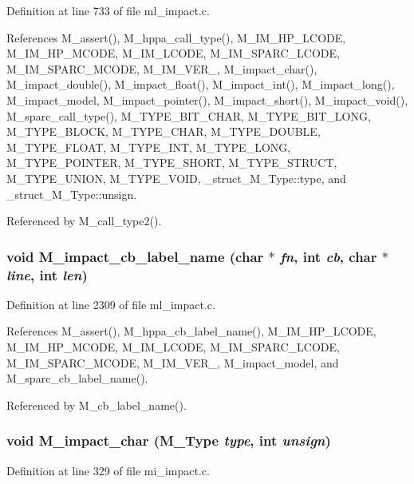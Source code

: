 Definition at line 733 of file ml\_\-impact.c.

References M\_\-assert(), M\_\-hppa\_\-call\_\-type(), M\_\-IM\_\-HP\_\-LCODE, M\_\-IM\_\-HP\_\-MCODE, M\_\-IM\_\-LCODE, M\_\-IM\_\-SPARC\_\-LCODE, M\_\-IM\_\-SPARC\_\-MCODE, M\_\-IM\_\-VER\_, M\_\-impact\_\-char(), M\_\-impact\_\-double(), M\_\-impact\_\-float(), M\_\-impact\_\-int(), M\_\-impact\_\-long(), M\_\-impact\_\-model, M\_\-impact\_\-pointer(), M\_\-impact\_\-short(), M\_\-impact\_\-void(), M\_\-sparc\_\-call\_\-type(), M\_\-TYPE\_\-BIT\_\-CHAR, M\_\-TYPE\_\-BIT\_\-LONG, M\_\-TYPE\_\-BLOCK, M\_\-TYPE\_\-CHAR, M\_\-TYPE\_\-DOUBLE, M\_\-TYPE\_\-FLOAT, M\_\-TYPE\_\-INT, M\_\-TYPE\_\-LONG, M\_\-TYPE\_\-POINTER, M\_\-TYPE\_\-SHORT, M\_\-TYPE\_\-STRUCT, M\_\-TYPE\_\-UNION, M\_\-TYPE\_\-VOID, \_\-struct\_\-M\_\-Type::type, and \_\-struct\_\-M\_\-Type::unsign.

Referenced by M\_\-call\_\-type2().
\subsubsection{\setlength{\rightskip}{0pt plus 5cm}void M\_\-impact\_\-cb\_\-label\_\-name (char $\ast$ {\em fn}, int {\em cb}, char $\ast$ {\em line}, int {\em len})}\label{m__impact_8h_842d345871ee8cabee91082195650597}




Definition at line 2309 of file ml\_\-impact.c.

References M\_\-assert(), M\_\-hppa\_\-cb\_\-label\_\-name(), M\_\-IM\_\-HP\_\-LCODE, M\_\-IM\_\-HP\_\-MCODE, M\_\-IM\_\-LCODE, M\_\-IM\_\-SPARC\_\-LCODE, M\_\-IM\_\-SPARC\_\-MCODE, M\_\-IM\_\-VER\_, M\_\-impact\_\-model, and M\_\-sparc\_\-cb\_\-label\_\-name().

Referenced by M\_\-cb\_\-label\_\-name().
\subsubsection{\setlength{\rightskip}{0pt plus 5cm}void M\_\-impact\_\-char (\bf{M\_\-Type} {\em type}, int {\em unsign})}\label{m__impact_8h_df76a1d268f371b5071ca69f2015d8a1}




Definition at line 329 of file mi\_\-impact.c.

